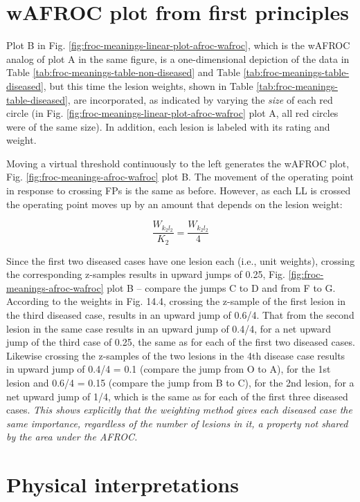 \documentclass[
]{book}
\begin{document}
\hypertarget{froc-meanings-wAFROC-plot-first-principles}{%
\section{wAFROC plot from first principles}\label{froc-meanings-wAFROC-plot-first-principles}}

Plot B in Fig. \ref{fig:froc-meanings-linear-plot-afroc-wafroc}, which is the wAFROC analog of plot A in the same figure, is a one-dimensional depiction of the data in Table \ref{tab:froc-meanings-table-non-diseased} and Table \ref{tab:froc-meanings-table-diseased}, but this time the lesion weights, shown in Table \ref{tab:froc-meanings-table-diseased}, are incorporated, as indicated by varying the \emph{size} of each red circle (in Fig. \ref{fig:froc-meanings-linear-plot-afroc-wafroc} plot A, all red circles were of the same size). In addition, each lesion is labeled with its rating and weight.

Moving a virtual threshold continuously to the left generates the wAFROC plot, Fig. \ref{fig:froc-meanings-afroc-wafroc} plot B. The movement of the operating point in response to crossing FPs is the same as before. However, as each LL is crossed the operating point moves up by an amount that depends on the lesion weight:

\[\frac{W_{k_2 l_2}}{K_2} = \frac{W_{k_2 l_2}}{4}\]

Since the first two diseased cases have one lesion each (i.e., unit weights), crossing the corresponding z-samples results in upward jumps of 0.25, Fig. \ref{fig:froc-meanings-afroc-wafroc} plot B -- compare the jumps C to D and from F to G. According to the weights in Fig. 14.4, crossing the z-sample of the first lesion in the third diseased case, results in an upward jump of 0.6/4. That from the second lesion in the same case results in an upward jump of 0.4/4, for a net upward jump of the third case of 0.25, the same as for each of the first two diseased cases. Likewise crossing the z-samples of the two lesions in the 4th disease case results in upward jump of 0.4/4 = 0.1 (compare the jump from O to A), for the 1st lesion and 0.6/4 = 0.15 (compare the jump from B to C), for the 2nd lesion, for a net upward jump of 1/4, which is the same as for each of the first three diseased cases. \emph{This shows explicitly that the weighting method gives each diseased case the same importance, regardless of the number of lesions in it, a property not shared by the area under the AFROC.}

\hypertarget{froc-meanings-physical-interpretions}{%
\section{Physical interpretations}\label{froc-meanings-physical-interpretions}}
\end{document}

